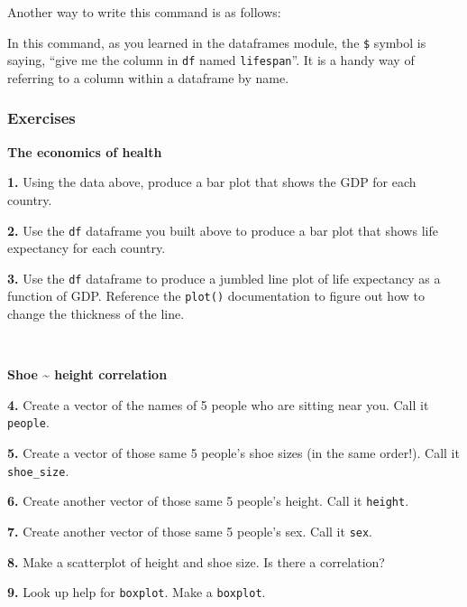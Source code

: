 \documentclass[]{book}
\newenvironment{Shaded}{\begin{snugshade}}{\end{snugshade}}
\newcommand{\KeywordTok}[1]{\textcolor[rgb]{0.13,0.29,0.53}{\textbf{#1}}}
\newcommand{\NormalTok}[1]{#1}
\newcommand{\OperatorTok}[1]{\textcolor[rgb]{0.81,0.36,0.00}{\textbf{#1}}}
\newcommand{\StringTok}[1]{\textcolor[rgb]{0.31,0.60,0.02}{#1}}
\begin{document}
Another way to write this command is as follows:

\begin{Shaded}
\end{Shaded}

In this command, as you learned in the dataframes module, the \texttt{\$} symbol is saying, ``give me the column in \texttt{df} named \texttt{lifespan}''. It is a handy way of referring to a column within a dataframe by name.

\hypertarget{exercises-7}{%
\subsubsection*{Exercises}\label{exercises-7}}

\textbf{The economics of health}

\textbf{1.} Using the data above, produce a bar plot that shows the GDP for each country.

\textbf{2.} Use the \texttt{df} dataframe you built above to produce a bar plot that shows life expectancy for each country.

\textbf{3.} Use the \texttt{df} dataframe to produce a jumbled line plot of life expectancy as a function of GDP. Reference the \texttt{plot()} documentation to figure out how to change the thickness of the line.

~

\textbf{Shoe \textasciitilde{} height correlation}

\textbf{4.} Create a vector of the names of 5 people who are sitting near you. Call it \texttt{people}.

\textbf{5.} Create a vector of those same 5 people's shoe sizes (in the same order!). Call it \texttt{shoe\_size}.

\textbf{6.} Create another vector of those same 5 people's height. Call it \texttt{height}.

\textbf{7.} Create another vector of those same 5 people's sex. Call it \texttt{sex}.

\textbf{8.} Make a scatterplot of height and shoe size. Is there a correlation?

\textbf{9.} Look up help for \texttt{boxplot}. Make a \texttt{boxplot}.
\end{document}
